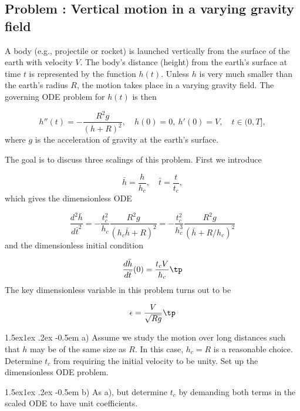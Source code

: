 \documentclass[graybox,envcountchap,sectrefs,final]{svmonodo}
\makeatletter
\newcounter{doconce:movie:counter}
\newenvironment{doconceexercise}{}{}
\newcounter{doconceexercisecounter}
\newcommand\subex{\@startsection{paragraph}{4}{\z@}%
                  {1.5ex\@plus1ex \@minus.2ex}%
                  {-0.5em}%
                  {\normalfont\normalsize\bfseries}}
\makeatother
\begin{document}
\begin{doconceexercise}

\subsection*{Problem \thedoconceexercisecounter: Vertical motion in a varying gravity field}

\label{scale:vib:exer:rocket}

A body (e.g., projectile or rocket) is launched vertically
from the surface of the earth with
velocity $V$. The body's distance (height) from the earth's surface
at time $t$ is represented by the function $h(t)$.
Unless $h$ is very much smaller than the earth's radius $R$, the motion
takes place in a varying gravity field. The governing ODE problem for
$h(t)$ is then

\begin{equation}
h''(t) = -\frac{R^2g}{(h+R)^2},\quad h(0)=0,\ h'(0)=V,\quad t\in (0,T],
\end{equation}
where $g$ is the acceleration of gravity at the earth's surface.

The goal is to discuss three scalings of this problem. First we introduce

\[ \bar h = \frac{h}{h_c},\quad \bar t = \frac{t}{t_c},\]
which gives the dimensionless ODE

\[
\frac{d^2\bar h}{d\bar t^2} = -\frac{t_c^2}{h_c}\frac{R^2g}{(h_c\bar h+R)^2}
= -\frac{t_c^2}{h_c^3}\frac{R^2g}{\left(\bar h+ R/h_c\right)^2}
\]
and the dimensionless initial condition

\[ \frac{d\bar h}{d\bar t}(0) = \frac{t_cV}{h_c}\tp\]
The key dimensionless variable in this problem turns out to be

\[ \epsilon = \frac{V}{\sqrt{Rg}}\tp\]


\subex{a)}
Assume we study the motion over long distances such that
$h$ may be of the same size as $R$. In this case, $h_c=R$ is a
reasonable choice. Determine $t_c$ from requiring the initial velocity
to be unity. Set up the dimensionless ODE problem.



\subex{b)}
As a), but determine $t_c$ by demanding both terms in the scaled ODE to
have unit coefficients.




\end{doconceexercise}
\end{document}
